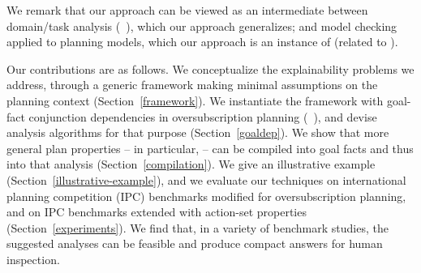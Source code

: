 We remark that our approach can be viewed as an intermediate between
domain/task analysis (\eg\ \cite{fox:long:jair-98}), which our
approach generalizes; and model checking applied to planning models,
which our approach is an instance of (related to
\cite{vaquero:etal:keq-13}). 
%
%


Our contributions are as follows. 
%
%
We conceptualize the explainability problems we address, through a
generic framework making minimal assumptions on the planning context
(Section~\ref{framework}). We instantiate the framework with goal-fact
conjunction dependencies in oversubscription planning
(\eg\ \cite{smith:icaps-04,domshlak:mirkis:jair-15}), and devise
analysis algorithms for that purpose (Section~\ref{goaldep}). We show
that more general plan properties -- in particular,
 -- can be compiled into goal facts and
thus into that analysis (Section~\ref{compilation}).
%
We give an illustrative example (Section~\ref{illustrative-example}),
and we evaluate our techniques on international planning competition
(IPC) benchmarks modified for oversubscription planning, and on IPC
benchmarks extended with action-set properties
(Section~\ref{experiments}).
%
%
We find that, in a variety of benchmark studies, the suggested
analyses can be feasible and produce compact answers for human
inspection.

